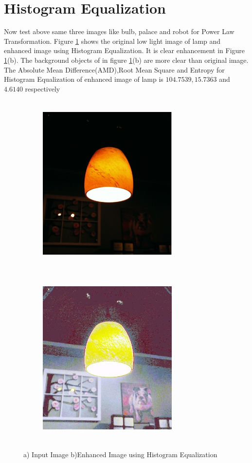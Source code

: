 \section{Histogram Equalization}
Now test above same three images like bulb, palace and robot for Power Law Transformation. Figure \ref{fig:histEqu} shows the original low light image of lamp and enhanced image using Histogram Equalization. It is clear enhancement in Figure \ref{fig:histEqu}(b). The background objects of in figure \ref{fig:histEqu}(b) are more clear than original image. The Absolute Mean Difference(AMD),Root Mean Square and Entropy for Histogram Equalization of enhanced image of lamp is $104.7539,15.7363$ and $4.6140$ respectively      


\begin{figure}
	\begin{subfigure}{8cm}
		\centering    
    	\includegraphics[width=7cm,height=9cm,keepaspectratio]{images/ch5/bulb_input.jpg}
    	\caption{} 
    \end{subfigure}
  	\begin{subfigure}{6cm}
  		\centering
  		\includegraphics[width=7cm,height=9cm,keepaspectratio]{images/ch5/bulb_hist_equ.jpg}
   		\caption{}
  	\end{subfigure}
  	\caption{a) Input Image b)Enhanced Image using Histogram Equalization}
  	\label{fig:histEqu}
\end{figure}

